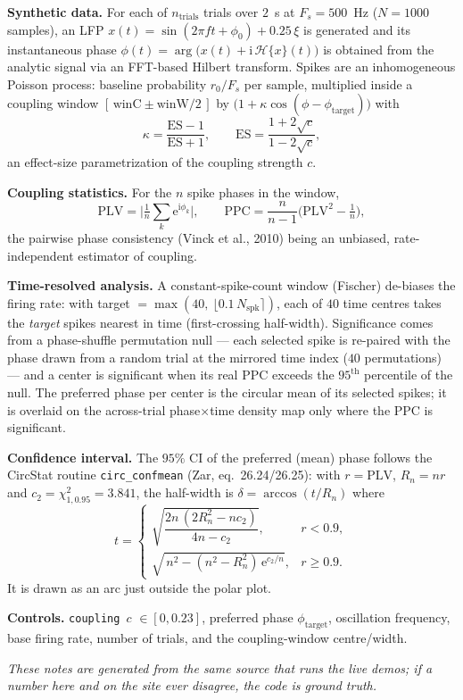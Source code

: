 \documentclass[11pt]{article}
\newcommand{\param}[1]{\textcolor{neonmag}{\texttt{#1}}}
\newcommand{\code}[1]{\texttt{#1}}
\newcommand{\E}{\mathrm{e}}
\newcommand{\ii}{\mathrm{i}}
\begin{document}
\textbf{Synthetic data.} For each of $n_{\text{trials}}$ trials over $2$~s at $F_s = 500$~Hz
($N=1000$ samples), an LFP $x(t) = \sin(2\pi f t + \phi_0) + 0.25\,\xi$ is generated and its
instantaneous phase $\phi(t) = \arg\!\big(x(t) + \ii\,\mathcal H\{x\}(t)\big)$ is obtained from
the analytic signal via an FFT-based Hilbert transform. Spikes are an inhomogeneous Poisson
process: baseline probability $r_0/F_s$ per sample, multiplied inside a coupling window
$[\,\text{winC}\pm\text{winW}/2\,]$ by $\big(1 + \kappa\cos(\phi - \phi_{\text{target}})\big)$ with
\[
\kappa = \frac{\text{ES}-1}{\text{ES}+1}, \qquad
\text{ES} = \frac{1 + 2\sqrt{c}}{1 - 2\sqrt{c}},
\]
an effect-size parametrization of the coupling strength $c$.

\textbf{Coupling statistics.} For the $n$ spike phases in the window,
\[
\text{PLV} = \Big|\tfrac1n \textstyle\sum_k \E^{\ii\phi_k}\Big|, \qquad
\text{PPC} = \frac{n}{n-1}\Big(\text{PLV}^2 - \tfrac1n\Big),
\]
the pairwise phase consistency (Vinck et al., 2010) being an unbiased, rate-independent
estimator of coupling.

\textbf{Time-resolved analysis.} A constant-spike-count window (Fischer) de-biases the firing
rate: with target $=\max(40,\ \lfloor 0.1\,N_{\text{spk}}\rceil)$, each of $40$ time centres takes
the \emph{target} spikes nearest in time (first-crossing half-width). Significance comes from a
phase-shuffle permutation null --- each selected spike is re-paired with the phase drawn from a
random trial at the mirrored time index ($40$ permutations) --- and a center is significant when
its real PPC exceeds the $95^{\text{th}}$ percentile of the null. The preferred phase per center
is the circular mean of its selected spikes; it is overlaid on the across-trial
phase$\times$time density map only where the PPC is significant.

\textbf{Confidence interval.} The $95\%$ CI of the preferred (mean) phase follows the CircStat
routine \code{circ\_confmean} (Zar, eq.\ 26.24/26.25): with $r=\text{PLV}$, $R_n = n r$ and
$c_2 = \chi^2_{1,0.95}=3.841$, the half-width is $\delta = \arccos(t/R_n)$ where
\[
t =
\begin{cases}
\sqrt{\dfrac{2n\,(2R_n^2 - n c_2)}{4n - c_2}}, & r < 0.9,\\[10pt]
\sqrt{\,n^2 - (n^2 - R_n^2)\,\E^{c_2/n}}, & r \ge 0.9.
\end{cases}
\]
It is drawn as an arc just outside the polar plot.

\textbf{Controls.} \param{coupling $c$} $\in[0,0.23]$, preferred phase $\phi_{\text{target}}$,
oscillation frequency, base firing rate, number of trials, and the coupling-window
centre/width.

\vfill
\begin{center}\small\itshape
These notes are generated from the same source that runs the live demos; if a number here and
on the site ever disagree, the code is ground truth.
\end{center}
\end{document}
